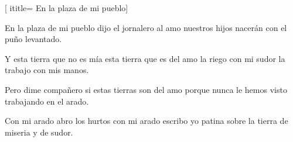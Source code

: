 [
ititle= {En la plaza de mi pueblo}]


\beginverse
En la plaza de mi pueblo
dijo el jornalero al amo
nuestros hijos nacerán
con el puño levantado.
\endverse

\beginverse
Y esta tierra que no es mía
esta tierra que es del amo
la riego con mi sudor
la trabajo con mis manos.
\endverse

\beginverse
Pero dime compañero
si estas tierras son del amo
porque nunca le hemos visto
trabajando en el arado.
\endverse

\beginverse
Con mi arado abro los hurtos
con mi arado escribo yo
patina sobre la tierra
de miseria y de sudor.
\endverse

\endsong